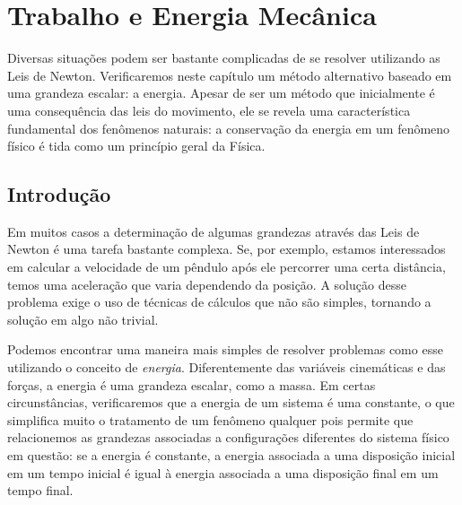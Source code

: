 \chapter{Trabalho e Energia Mecânica}
\label{Chap:Energia}





\begin{fullwidth}
{\it

Diversas situações podem ser bastante complicadas de se resolver utilizando as Leis de Newton. Verificaremos neste capítulo um método alternativo baseado em uma grandeza escalar: a energia. Apesar de ser um método que inicialmente é uma consequência das leis do movimento, ele se revela uma característica fundamental dos fenômenos naturais: a conservação da energia em um fenômeno físico é tida como um princípio geral da Física.

}
\end{fullwidth}

\section{Introdução} 

Em muitos casos a determinação de algumas grandezas através das Leis de Newton é uma tarefa bastante complexa. Se, por exemplo, estamos interessados em calcular a velocidade de um pêndulo após ele percorrer uma certa distância, temos uma aceleração que varia dependendo da posição. A solução desse problema exige o uso de técnicas de cálculos que não são simples, tornando a solução em algo não trivial.

Podemos encontrar uma maneira mais simples de resolver problemas como esse utilizando o conceito de \emph{energia}. Diferentemente das variáveis cinemáticas e das forças, a energia é uma grandeza escalar, como a massa. Em certas circunstâncias, verificaremos que a energia de um sistema é uma constante, o que simplifica muito o tratamento de um fenômeno qualquer pois permite que relacionemos as grandezas associadas a configurações diferentes do sistema físico em questão: se a energia é constante, a energia associada a uma disposição inicial em um tempo inicial é igual à energia associada a uma disposição final em um tempo final.

